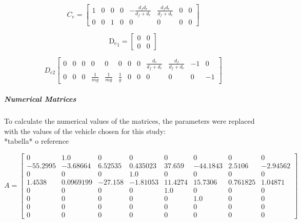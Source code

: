 \documentclass[]{report}
\begin{document}
\begin{equation}
	C_e =
	\begin{bmatrix}
		1 & 0 & 0 & 0 & -\frac{d_f d_r}{d_f + d_r} & \frac{d_f d_r}{d_f + d_r} & 0 & 0 \\
		0 & 0 & 1 & 0 & 0 & 0 & 0 & 0
	\end{bmatrix}
\end{equation}


	
	\begin{equation}
		\mathrm{D_e}_1 =
		\begin{bmatrix}
			0 & 0 \\
			0 & 0
		\end{bmatrix}
	\end{equation}
	


\begin{equation}
	D_{e2}
	\left[ 
	\begin{array}{cccccccccccc}
		0 & 0 & 0 & 0 & 0 & 0 & 0 & 0 & \frac{d_r}{d_f+d_r} & \frac{d_f}{d_f+d_r} & -1 & 0 \\
		0 & 0 & 0 & \frac{1}{mg} & \frac{1}{mg} & \frac{1}{g} & 0 & 0 & 0 & 0 & 0 & -1
	\end{array}\right] 
\end{equation}
	
	\subparagraph{Numerical Matrices}
	To calculate the numerical values of the matrices, the parameters were replaced with the values of the vehicle chosen for this study:\\
	*tabella* o reference
	\\
	\hspace{-0.8cm}
\begin{minipage}{0.45\textwidth}
	\[
A =
\begin{bmatrix}
	0 & 1.0 & 0 & 0 & 0 & 0 & 0 & 0 \\
	-55.2995 & -3.68664 & 6.52535 & 0.435023 & 37.659 & -44.1843 & 2.5106 & -2.94562 \\
	0 & 0 & 0 & 1.0 & 0 & 0 & 0 & 0 \\
	1.4538 & 0.0969199 & -27.158 & -1.81053 & 11.4274 & 15.7306 & 0.761825 & 1.04871 \\
	0 & 0 & 0 & 0 & 1.0 & 0 & 0 & 0 \\
	0 & 0 & 0 & 0 & 0 & 1.0 & 0 & 0 \\
	0 & 0 & 0 & 0 & 0 & 0 & 0 & 0 \\
	0 & 0 & 0 & 0 & 0 & 0 & 0 & 0
\end{bmatrix}
	\]
\end{minipage}
\end{document}
